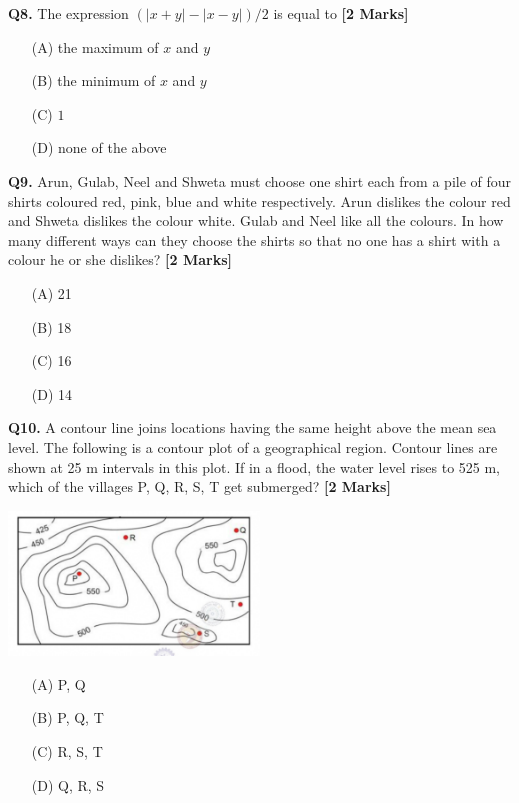 \documentclass[11pt]{article}
\newcommand{\questionb}[2]{
    \noindent\textbf{Q#2.} #1 \hfill \textbf{[2 Marks]}
}
\begin{document}
\questionb{The expression \( (\lvert x + y \rvert - \lvert x - y \rvert)/2 \) is equal to}{8}
\begin{enumerate}
    \item[(A)] the maximum of \( x \) and \( y \)  
    \item[(B)] the minimum of \( x \) and \( y \)  
    \item[(C)] \( 1 \)  
    \item[(D)] none of the above  
\end{enumerate}
\vspace{0.5cm}

\questionb{Arun, Gulab, Neel and Shweta must choose one shirt each from a pile of four shirts coloured red, pink, blue and white respectively. Arun dislikes the colour red and Shweta dislikes the colour white. Gulab and Neel like all the colours. In how many different ways can they choose the shirts so that no one has a shirt with a colour he or she dislikes?}{9}
\begin{enumerate}
    \item[(A)] 21  
    \item[(B)] 18  
    \item[(C)] 16  
    \item[(D)] 14  
\end{enumerate}
\vspace{0.5cm}

\questionb{A contour line joins locations having the same height above the mean sea level. The following is a contour plot of a geographical region. Contour lines are shown at 25 m intervals in this plot. If in a flood, the water level rises to 525 m, which of the villages P, Q, R, S, T get submerged?}{10}
\begin{center}
\includegraphics[width=0.5\textwidth]{figures/10.png}
\end{center}
\begin{enumerate}
    \item[(A)] P, Q  
    \item[(B)] P, Q, T  
    \item[(C)] R, S, T  
    \item[(D)] Q, R, S  
\end{enumerate}
\vspace{0.5cm}
\end{document}
